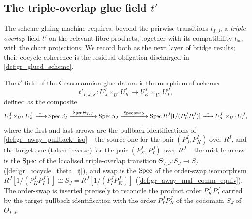 \subsection*{The triple-overlap glue field \(t'\)}

The scheme-gluing machine requires, beyond the pairwise transitions \(t_{I,J}\), a
\emph{triple-overlap} field \(t'\) on the relevant fibre products, together with
its compatibility \(t_{\mathrm{fac}}\) with the chart projections. We record both
as the next layer of bridge results; their cocycle coherence is the residual
obligation discharged in \cref{def:gr_glued_scheme}.

\begin{definition}\leanok
  \label{def:gr_chart_transition'}
  The \(t'\)-field of the Grassmannian glue datum is the morphism of schemes
  \[
    t'_{I,J,K} : U^I_J \times_{U^I} U^I_K \longrightarrow U^J_K \times_{U^J} U^J_I ,
  \]
  defined as the composite
  \[
    U^I_J \times_{U^I} U^I_K
      \xrightarrow{\ \sim\ } \operatorname{Spec} S_I
      \xrightarrow{\ \operatorname{Spec} \Theta_{I,J}\ } \operatorname{Spec} S_J
      \xrightarrow{\ \operatorname{Spec} \mathrm{swap}\ } \operatorname{Spec} R^J[1/(P^J_K P^J_I)]
      \xrightarrow{\ \sim\ } U^J_K \times_{U^J} U^J_I ,
  \]
  where the first and last arrows are the pullback identifications of
  \cref{def:gr_away_pullback_iso} -- the source one for the pair \((P^I_J, P^I_K)\)
  over \(R^I\), and the target one (taken inverse) for the pair \((P^J_K, P^J_I)\)
  over \(R^J\) -- the middle arrow is the \(\operatorname{Spec}\) of the localised
  triple-overlap transition \(\Theta_{I,J} : S_J \to S_I\)
  (\cref{def:gr_cocycle_theta_ij}), and \(\mathrm{swap}\) is the \(\operatorname{Spec}\) of the
  order-swap isomorphism \(R^J[1/(P^J_K P^J_I)] \cong S_J = R^J[1/(P^J_I P^J_K)]\)
  (\cref{def:gr_away_mul_comm_equiv}). The order-swap is inserted precisely to
  reconcile the product order \(P^J_K P^J_I\) carried by the target pullback
  identification with the order \(P^J_I P^J_K\) of the codomain \(S_J\) of
  \(\Theta_{I,J}\).
\end{definition}

